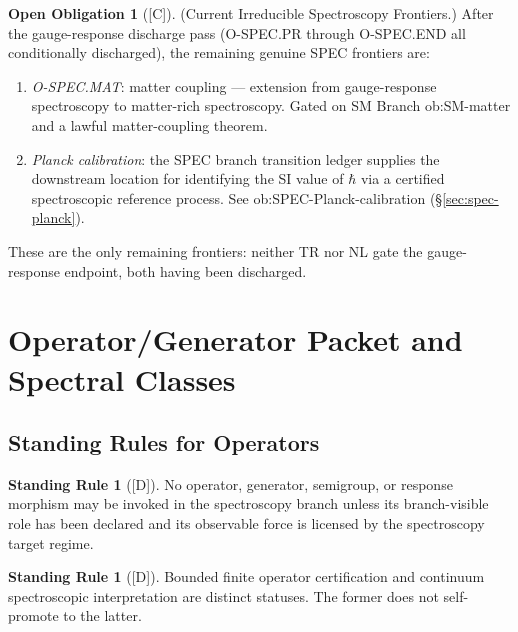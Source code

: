 \documentclass[12pt,oneside]{amsbook}
\theoremstyle{plain}
\theoremstyle{definition}
\newtheorem{standingrule}[theorem]{Standing Rule}
\newtheorem{obligation}[theorem]{Open Obligation}
\theoremstyle{remark}
\newcommand{\status}[1]{\textup{[#1]}}
\begin{document}
\begin{obligation}[\status{C}]\label{ob:spec-frontier-min}
\textup{(Current Irreducible Spectroscopy Frontiers.)}
After the gauge-response discharge pass (O-SPEC.PR through O-SPEC.END
all conditionally discharged), the remaining genuine SPEC frontiers are:
\begin{enumerate}[label=\textup{(\arabic*)}]
 \item \emph{O-SPEC.MAT}: matter coupling --- extension from
 gauge-response spectroscopy to matter-rich spectroscopy. Gated on
 SM Branch ob:SM-matter and a lawful matter-coupling theorem.
 \item \emph{Planck calibration}: the SPEC branch transition ledger
 supplies the downstream location for identifying the SI value of
 $\hbar$ via a certified spectroscopic reference process. See
 ob:SPEC-Planck-calibration (\S\ref{sec:spec-planck}).
\end{enumerate}
These are the only remaining frontiers: neither TR nor NL gate
the gauge-response endpoint, both having been discharged.
\end{obligation}

\section{Operator/Generator Packet and Spectral Classes}
\label{sec:spec-operator}

\subsection{Standing Rules for Operators}\label{sec:spec-op-sr}

\begin{standingrule}[\status{D}]\label{sr:spec-op-declared}
No operator, generator, semigroup, or response morphism may be invoked in
the spectroscopy branch unless its branch-visible role has been declared
and its observable force is licensed by the spectroscopy target regime.
\end{standingrule}

\begin{standingrule}[\status{D}]\label{sr:spec-no-continuum-promotion}
Bounded finite operator certification and continuum spectroscopic
interpretation are distinct statuses. The former does not self-promote
to the latter.
\end{standingrule}
\end{document}
